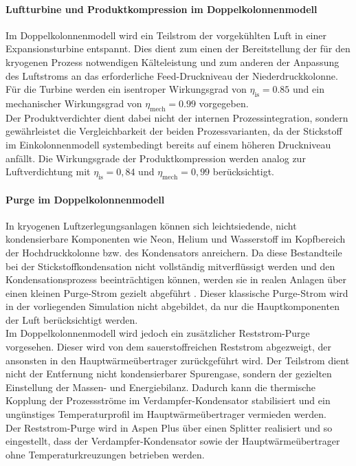 \paragraph{Luftturbine und Produktkompression im Doppelkolonnenmodell} \label{sec:modell_luftturbine}

Im Doppelkolonnenmodell wird ein Teilstrom der vorgekühlten Luft in einer
Expansionsturbine entspannt. Dies dient zum einen der Bereitstellung der für den
kryogenen Prozess notwendigen Kälteleistung und zum anderen der Anpassung des
Luftstroms an das erforderliche Feed-Druckniveau der Niederdruckkolonne. Für die
Turbine werden ein isentroper Wirkungsgrad von \(\eta_\mathrm{is}=\num{0,85}\) und ein mechanischer Wirkungsgrad von \(\eta_\mathrm{mech}=\num{0,99}\) vorgegeben.\\
Der Produktverdichter dient dabei nicht der internen Prozessintegration, sondern
gewährleistet die Vergleichbarkeit der beiden Prozessvarianten, da der Stickstoff
im Einkolonnenmodell systembedingt bereits auf einem höheren Druckniveau anfällt.
Die Wirkungsgrade der Produktkompression werden analog zur Luftverdichtung mit
$\eta_\mathrm{is}=0{,}84$ und $\eta_\mathrm{mech}=0{,}99$ berücksichtigt.


\paragraph{Purge im Doppelkolonnenmodell}
\label{sec:modell_Purge}

In kryogenen Luftzerlegungsanlagen können sich leichtsiedende, nicht
kondensierbare Komponenten wie Neon, Helium und Wasserstoff im Kopfbereich der
Hochdruckkolonne bzw. des Kondensators anreichern. Da diese Bestandteile bei der
Stickstoffkondensation nicht vollständig mitverflüssigt werden und den
Kondensationsprozess beeinträchtigen können, werden sie in realen Anlagen über
einen kleinen Purge-Strom gezielt abgeführt
\cite{hausen_linde_tieftemperaturtechnik_1985}. Dieser klassische Purge-Strom
wird in der vorliegenden Simulation nicht abgebildet, da nur die
Hauptkomponenten der Luft berücksichtigt werden.\\
Im Doppelkolonnenmodell wird jedoch ein zusätzlicher Reststrom-Purge
vorgesehen. Dieser wird von dem sauerstoffreichen Reststrom abgezweigt, der
ansonsten in den Hauptwärmeübertrager zurückgeführt wird. Der Teilstrom dient
nicht der Entfernung nicht kondensierbarer Spurengase, sondern der gezielten
Einstellung der Massen- und Energiebilanz. Dadurch kann die thermische
Kopplung der Prozessströme im Verdampfer-Kondensator stabilisiert und ein
ungünstiges Temperaturprofil im Hauptwärmeübertrager vermieden werden.\\
Der Reststrom-Purge wird in Aspen Plus über einen Splitter realisiert und so
eingestellt, dass der Verdampfer-Kondensator sowie der Hauptwärmeübertrager ohne
Temperaturkreuzungen betrieben werden. 


